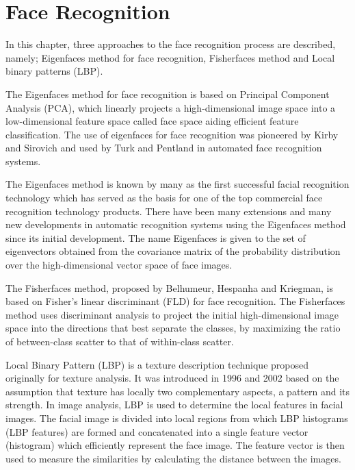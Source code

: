 \chapter{Face Recognition}
In this chapter, three approaches to the face recognition process are described, namely; Eigenfaces method for face recognition, Fisherfaces method and Local binary patterns (LBP).

The Eigenfaces method for face recognition is based on Principal Component Analysis (PCA), which linearly projects a high-dimensional image space into a low-dimensional feature space called face space aiding efficient feature classification. The use of eigenfaces for face recognition was pioneered by Kirby and Sirovich \citep{sirovich19} and used by Turk and Pentland \citep{turk19} in automated face recognition systems. 

The Eigenfaces method is known by many as the first successful facial recognition technology which has served as the basis for one of the top commercial face recognition technology products. There have been many extensions and many new developments in automatic recognition systems using the Eigenfaces method since its initial development. The name Eigenfaces is given to the set of eigenvectors obtained from the covariance matrix of the probability distribution over the high-dimensional vector space of face images.

The Fisherfaces method, proposed by Belhumeur, Hespanha and Kriegman, \citep{belhu} is based on Fisher's linear discriminant (FLD) for face recognition. The Fisherfaces method uses discriminant analysis to project the initial high-dimensional image space into the directions that best separate the classes, by maximizing the ratio of between-class scatter to that of within-class scatter. 

Local Binary Pattern (LBP) is a texture description technique proposed originally for texture analysis. It was introduced in 1996 and 2002 \citep{ojala2} based on the assumption that texture has locally two complementary aspects, a pattern and its strength. In image analysis, LBP is used to determine the local features in facial images. The facial image  is divided into local regions from which LBP histograms (LBP features) are formed and concatenated into a single feature vector (histogram) which efficiently represent the face image. The feature vector is then used to measure the similarities by calculating the distance between the images.




